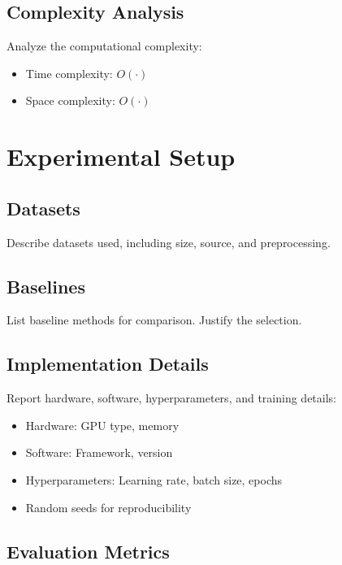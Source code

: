 \documentclass[journal]{IEEEtran}
\begin{document}
\subsection{Complexity Analysis}

Analyze the computational complexity:
\begin{itemize}
  \item Time complexity: $O(\cdot)$
  \item Space complexity: $O(\cdot)$
\end{itemize}

\section{Experimental Setup}

\subsection{Datasets}

Describe datasets used, including size, source, and preprocessing.

\subsection{Baselines}

List baseline methods for comparison. Justify the selection.

\subsection{Implementation Details}

Report hardware, software, hyperparameters, and training details:
\begin{itemize}
  \item Hardware: GPU type, memory
  \item Software: Framework, version
  \item Hyperparameters: Learning rate, batch size, epochs
  \item Random seeds for reproducibility
\end{itemize}

\subsection{Evaluation Metrics}
\end{document}
